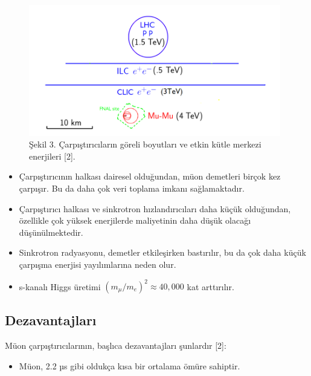 \documentclass{article}
\begin{document}
 \begin{figure}[h]
 \centering
\includegraphics[width=11cm]{image/Ekran Görüntüsü - 2021-06-23 02-34-03.png}
\caption*{Şekil 3. Çarpıştırıcıların göreli boyutları ve etkin kütle merkezi enerjileri [2].}
	\end{figure}
	
	
\begin{itemize}
    \item Çarpıştırıcının halkası dairesel olduğundan, müon demetleri birçok kez çarpışır. Bu da daha çok veri toplama imkanı sağlamaktadır.
\end{itemize}

\begin{itemize}
    \item Çarpıştırıcı halkası ve sinkrotron hızlandırıcıları daha küçük olduğundan, özellikle çok yüksek enerjilerde maliyetinin daha düşük olacağı düşünülmektedir.
\end{itemize}

\begin{itemize}
    \item Sinkrotron radyasyonu, demetler etkileşirken bastırılır, bu da çok daha küçük çarpışma enerjisi yayılımlarına neden olur.
\end{itemize}

\begin{itemize}
    \item s-kanalı Higgs üretimi $(m_{\mu}/m_{e})^{2} \approx 40,000$ kat arttırılır.
\end{itemize}

\subsection{Dezavantajları}

Müon çarpıştırıcılarının, başlıca dezavantajları şunlardır [2]: 
\begin{itemize}
    \item Müon, 2.2 µs gibi oldukça kısa bir ortalama ömüre sahiptir.
\end{itemize}
\end{document}
